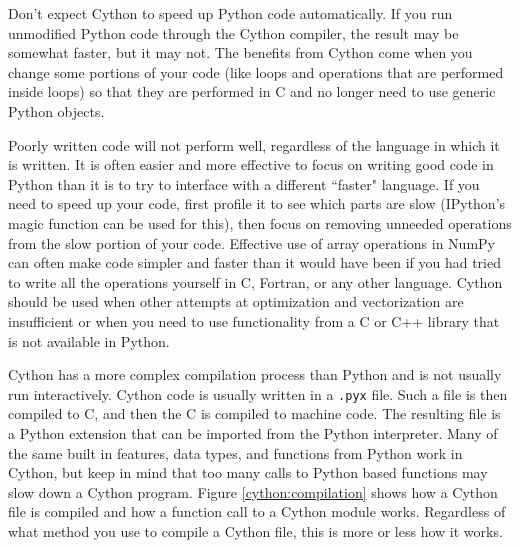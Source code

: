 \begin{warn}
Don't expect Cython to speed up Python code automatically.
If you run unmodified Python code through the Cython compiler, the result may be somewhat faster, but it may not.
The benefits from Cython come when you change some portions of your code (like loops and operations that are performed inside loops) so that they are performed in C and no longer need to use generic Python objects.
\end{warn}

\begin{warn}
Poorly written code will not perform well, regardless of the language in which it is written.
It is often easier and more effective to focus on writing good code in Python than it is to try to interface with a different ``faster" language.
If you need to speed up your code, first profile it to see which parts are slow (IPython's magic function  can be used for this), then focus on removing unneeded operations from the slow portion of your code.
Effective use of array operations in NumPy can often make code simpler and faster than it would have been if you had tried to write all the operations yourself in C, Fortran, or any other language.
Cython should be used when other attempts at optimization and vectorization are insufficient or when you need to use functionality from a C or C++ library that is not available in Python.
\end{warn}

Cython has a more complex compilation process than Python and is not usually run interactively.
Cython code is usually written in a \texttt{.pyx} file.
Such a file is then compiled to C, and then the C is compiled to machine code.
The resulting file is a Python extension that can be imported from the Python interpreter.
Many of the same built in features, data types, and functions from Python work in Cython, but keep in mind that too many calls to Python based functions may slow down a Cython program.
Figure \ref{cython:compilation} shows how a Cython file is compiled and how a function call to a Cython module works.
Regardless of what method you use to compile a Cython file, this is more or less how it works.


